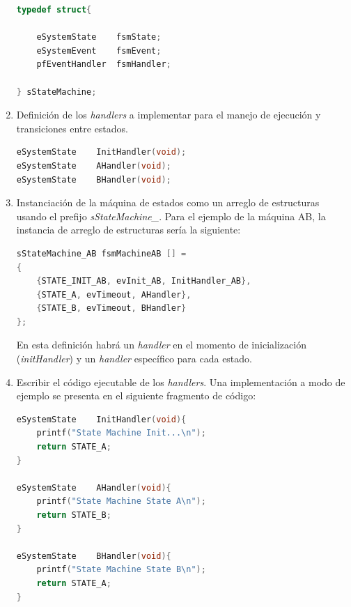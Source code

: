 \begin{enumerate}
\begin{lstlisting}[caption=Estructura para máquina de estados.,
	language=C, 
	backgroundcolor=\color{mygray},
	]
typedef struct{

	eSystemState  	fsmState;
	eSystemEvent  	fsmEvent;
	pfEventHandler	fsmHandler;

} sStateMachine;
\end{lstlisting}

\item Definición de los \textit{handlers} a implementar para el manejo de ejecución y transiciones entre estados.

\begin{lstlisting}[caption=Definición de handlers.,
	language=C, 
	backgroundcolor=\color{mygray},
	]
eSystemState 	InitHandler(void);
eSystemState 	AHandler(void);
eSystemState 	BHandler(void);
\end{lstlisting}

\item Instanciación de la máquina de estados como un arreglo de estructuras usando el prefijo \textit{sStateMachine\_}. Para el ejemplo de la máquina AB, la instancia de arreglo de estructuras sería la siguiente:

\begin{lstlisting}[caption=Ejemplo de instanciación de una máquina de estados.,
	language=C, 
	backgroundcolor=\color{mygray},
	]
sStateMachine_AB fsmMachineAB [] = 
{
	{STATE_INIT_AB, evInit_AB, InitHandler_AB},
	{STATE_A, evTimeout, AHandler},
	{STATE_B, evTimeout, BHandler}
};
\end{lstlisting}

En esta definición habrá un \textit{handler} en el momento de inicialización (\textit{initHandler}) y  un \textit{handler} específico para cada estado.

\item Escribir el código ejecutable de los \textit{handlers}. Una implementación a modo de ejemplo se presenta en el siguiente fragmento de código:

\begin{lstlisting}[caption=Ejemplo de implementación de handlers.,
	language=C, 
	backgroundcolor=\color{mygray},
	]
eSystemState 	InitHandler(void){ 
	printf("State Machine Init...\n");
	return STATE_A; 
}

eSystemState 	AHandler(void){ 
	printf("State Machine State A\n");
	return STATE_B; 
}

eSystemState 	BHandler(void){ 
	printf("State Machine State B\n");
	return STATE_A; 
}
\end{lstlisting}
\end{enumerate}


